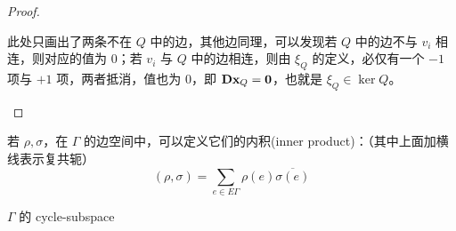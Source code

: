 \begin{proof}
\begin{enumerate}
\begin{center}
\begin{tikzpicture}[node distance = 1.5 cm]
  \end{tikzpicture}
\end{center}
此处只画出了两条不在 $Q$ 中的边，其他边同理，可以发现若 $Q$ 中的边不与 $v_i$ 相连，则对应的值为 $0$；若 $v_i$ 与 $Q$ 中的边相连，则由 $\xi_Q$ 的定义，必仅有一个 $-1$ 项与 $+1$ 项，两者抵消，值也为 $0$，即 $\textbf {Dx}_Q = \textbf 0$，也就是 $\xi_Q \in \ker Q$。
\end{enumerate}
\end{proof}

若 $\rho, \sigma$，在 $\Gamma$ 的边空间中，可以定义它们的内积(inner product)：（其中上面加横线表示复共轭）
\[
(\rho, \sigma) = \sum_{e \in E\Gamma} \rho(e) \overline{\sigma(e)}
\]

\begin{definition}
$\Gamma$ 的 cycle-subspace 
\end{definition}






































